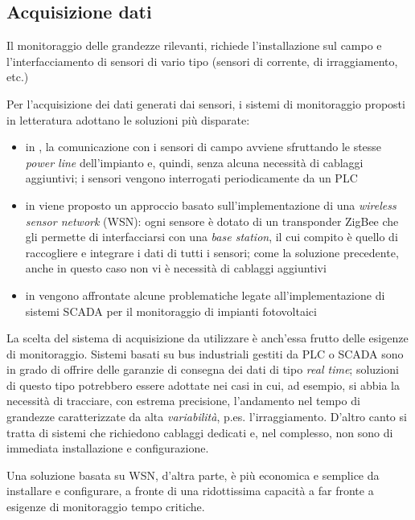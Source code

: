 \subsection{Acquisizione dati}
Il monitoraggio delle grandezze rilevanti, richiede l'installazione sul campo e 
l'interfacciamento di sensori di vario tipo (sensori di corrente, di irraggiamento, etc.)
%

%
Per l'acquisizione dei dati generati dai sensori, i sistemi di monitoraggio proposti in 
letteratura adottano le soluzioni pi\`u disparate:
%
\begin{itemize}
\item in \cite{roman06}, la comunicazione con i sensori di campo avviene sfruttando  
      le stesse \emph{power line} dell'impianto e, quindi, senza alcuna necessit\`a di 
      cablaggi aggiuntivi; i sensori vengono interrogati periodicamente da un PLC
\item in \cite{xiaoli11} viene proposto un approccio basato sull'implementazione di una 
      \emph{wireless sensor network} (WSN): ogni sensore \`e dotato di un transponder 
      ZigBee\cite{zigbee} che gli permette di interfacciarsi con una \emph{base station},
      il cui compito \`e quello di raccogliere e integrare i dati di tutti i sensori;
      come la soluzione precedente, anche in questo caso non vi \`e necessit\`a di 
      cablaggi aggiuntivi
\item in \cite{guozhen09} vengono affrontate alcune problematiche legate 
      all'implementazione di sistemi SCADA per il monitoraggio di impianti fotovoltaici
\end{itemize}
%
La scelta del sistema di acquisizione da utilizzare \`e anch'essa frutto delle esigenze 
di monitoraggio. 
%
Sistemi basati su bus industriali gestiti da PLC o SCADA sono in grado di 
offrire delle garanzie di consegna dei dati di tipo \emph{real time}; 
%
soluzioni di questo tipo potrebbero essere adottate nei casi in cui, ad esempio, 
si abbia la necessit\`a di tracciare, con estrema precisione, l'andamento nel tempo 
di grandezze caratterizzate da alta \emph{variabilit\`a}, p.es. l'irraggiamento.
D'altro canto si tratta di sistemi che richiedono cablaggi dedicati e, nel complesso, 
non sono di immediata installazione e configurazione.
%

%
Una soluzione basata su WSN, d'altra parte, \`e pi\`u economica e semplice da 
installare e configurare, a fronte di una ridottissima capacit\`a a far fronte a 
esigenze di monitoraggio tempo critiche.
%

